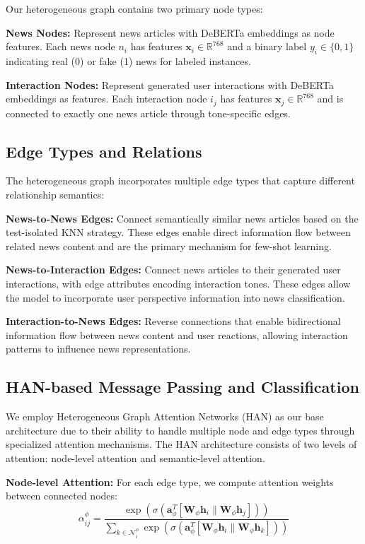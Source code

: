 Our heterogeneous graph contains two primary node types:

\textbf{News Nodes:} Represent news articles with DeBERTa embeddings as node features. Each news node $n_i$ has features $\mathbf{x}_i \in \mathbb{R}^{768}$ and a binary label $y_i \in \{0, 1\}$ indicating real (0) or fake (1) news for labeled instances.

\textbf{Interaction Nodes:} Represent generated user interactions with DeBERTa embeddings as features. Each interaction node $i_j$ has features $\mathbf{x}_j \in \mathbb{R}^{768}$ and is connected to exactly one news article through tone-specific edges.

\subsection{Edge Types and Relations}

The heterogeneous graph incorporates multiple edge types that capture different relationship semantics:

\textbf{News-to-News Edges:} Connect semantically similar news articles based on the test-isolated KNN strategy. These edges enable direct information flow between related news content and are the primary mechanism for few-shot learning.

\textbf{News-to-Interaction Edges:} Connect news articles to their generated user interactions, with edge attributes encoding interaction tones. These edges allow the model to incorporate user perspective information into news classification.

\textbf{Interaction-to-News Edges:} Reverse connections that enable bidirectional information flow between news content and user reactions, allowing interaction patterns to influence news representations.

\subsection{HAN-based Message Passing and Classification}

We employ Heterogeneous Graph Attention Networks (HAN) as our base architecture due to their ability to handle multiple node and edge types through specialized attention mechanisms. The HAN architecture consists of two levels of attention: node-level attention and semantic-level attention.

\textbf{Node-level Attention:} For each edge type, we compute attention weights between connected nodes:
\begin{equation}
\alpha_{ij}^{\phi} = \frac{\exp(\sigma(\mathbf{a}_{\phi}^T[\mathbf{W}_{\phi}\mathbf{h}_i \| \mathbf{W}_{\phi}\mathbf{h}_j]))}{\sum_{k \in \mathcal{N}_i^{\phi}} \exp(\sigma(\mathbf{a}_{\phi}^T[\mathbf{W}_{\phi}\mathbf{h}_i \| \mathbf{W}_{\phi}\mathbf{h}_k]))}
\end{equation}

